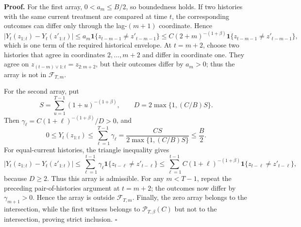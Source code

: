 \textbf{Proof.} For the first array, \(0<a_m\le B/2\), so boundedness holds. If two histories with the same current treatment are compared at time \(t\), the corresponding outcomes can differ only through the lag-\((m+1)\) coordinate. Hence
\[
|Y_t(z_{1:t})-Y_t(z'_{1:t})|
\le a_m\mathbf1\{z_{t-m-1}\ne z'_{t-m-1}\}
\le C(2+m)^{-(1+\beta)}\mathbf1\{z_{t-m-1}\ne z'_{t-m-1}\},
\]
which is one term of the required historical envelope. At \(t=m+2\), choose two histories that agree in coordinates \(2,\ldots,m+2\) and differ in coordinate one. They agree on \(z_{(t-m)\vee1:t}=z_{2:m+2}\), but their outcomes differ by \(a_m>0\); thus the array is not in \(\mathcal F_{T,m}\).

For the second array, put
\[
S=\sum_{u=1}^{T-1}(1+u)^{-(1+\beta)},
\qquad
D=2\max\{1,(C/B)S\}.
\]
Then \(\gamma_\ell=C(1+\ell)^{-(1+\beta)}/D>0\), and
\[
0\le Y_t(z_{1:t})
\le \sum_{\ell=1}^{T-1}\gamma_\ell
=\frac{CS}{2\max\{1,(C/B)S\}}
\le \frac B2.
\]
For equal-current histories, the triangle inequality gives
\[
|Y_t(z_{1:t})-Y_t(z'_{1:t})|
\le\sum_{\ell=1}^{t-1}\gamma_\ell
\mathbf1\{z_{t-\ell}\ne z'_{t-\ell}\}
\le\sum_{\ell=1}^{t-1}C(1+\ell)^{-(1+\beta)}
\mathbf1\{z_{t-\ell}\ne z'_{t-\ell}\},
\]
because \(D\ge2\). Thus this array is admissible. For any \(m<T-1\), repeat the preceding pair-of-histories argument at \(t=m+2\); the outcomes now differ by \(\gamma_{m+1}>0\). Hence the array is outside \(\mathcal F_{T,m}\). Finally, the zero array belongs to the intersection, while the first witness belongs to \(\mathcal P_{T,\beta}(C)\) but not to the intersection, proving strict inclusion. \(\square\)